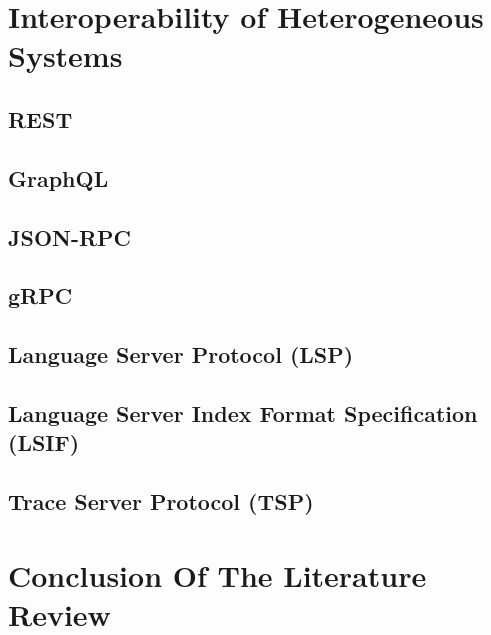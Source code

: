 \section{Interoperability of Heterogeneous Systems}

\subsection{REST}

\subsection{GraphQL}

\subsection{JSON-RPC}

\subsection{gRPC}

\subsection{Language Server Protocol (LSP)}

\subsection{Language Server Index Format Specification (LSIF)}

\subsection{Trace Server Protocol (TSP)}




\section{Conclusion Of The Literature Review}

